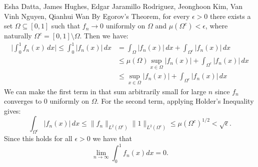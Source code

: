 

\begin{solution}{Esha Datta, James Hughes, Edgar Jaramillo Rodriguez, Jeonghoon Kim, Van Vinh Nguyen, Qianhui Wan}
         By Egorov's Theorem, for every $\epsilon >0$ there exists a set $\Omega \subseteq [0,1]$ such that $f_n\to 0$ uniformly on $\Omega$ and $\mu(\Omega^c) < \epsilon$, where naturally $\Omega^c = [0,1]\setminus \Omega$.
         Then we have:
        \begin{equation*}
            \begin{split}
                \bigg|\int_0^1 f_n(x)\,dx \bigg| 
                \leq  \int_0^1 |f_n(x)| \,dx 
                &= \int_\Omega |f_n(x)| \,dx + \int_{\Omega^c} |f_n(x)| \,dx \\
                &\leq \mu(\Omega) \sup_{x\in \Omega}|f_n(x)| + \int_{\Omega^c} |f_n(x)| \,dx \\
                &\leq\sup_{x\in \Omega}|f_n(x)| + \int_{\Omega^c} |f_n(x)| \,dx
            \end{split}
        \end{equation*}
        We can make the first term in that sum arbitrarily small for large $n$ since $f_n$ converges to $0$ uniformly on $\Omega$.
        For the second term, applying Holder's Inequality gives:
        \[ \int_{\Omega^c} |f_n(x)| \,dx \leq \lVert f_n \rVert_{L^2(\Omega^c)} \lVert 1 \rVert_{L^2(\Omega^c)} \leq \mu(\Omega^c)^{1/2} < \sqrt{\epsilon}. \]
        Since this holds for all $\epsilon>0$ we have that 
        \[ \lim_{n\rightarrow\infty} \int_0^1 f_n(x) dx = 0. \]
\end{solution}


